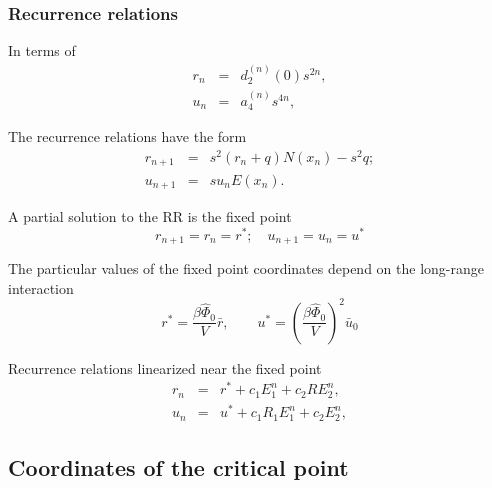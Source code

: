 \documentclass[8pt]{beamer}
\begin{document}
	\begin{frame}
		\frametitle{Recurrence relations}
		
		In terms of
		\begin{eqnarray*}
			r_n & = & d_2^{(n)}(0)s^{2n},
			\\
			u_n & = & a_4^{(n)}s^{4n},
		\end{eqnarray*}
		
		The recurrence relations have the form
		\begin{eqnarray*}
			r_{n+1} & = & s^2(r_n + q) N(x_n) - s^2 q;
			\nonumber\\
			u_{n+1} & = & s u_n E(x_n).
		\end{eqnarray*}
		
		A partial solution to the RR is the fixed point
		\begin{equation*}
			r_{n+1} = r_n = r^*; \quad u_{n+1} = u_n = u^*
		\end{equation*}
		
		The particular values of the fixed point coordinates depend on the long-range interaction
		\begin{equation*}
			r^* = \frac{\beta\hat{\Phi}_0}{V} \bar{r}, 
			\qquad 
			u^* = \left(\frac{\beta\hat{\Phi}_0}{V}\right)^2 \bar{u}_0
		\end{equation*}
		
		Recurrence relations linearized near the fixed point
		\begin{eqnarray*}
			r_n & = & r^* + c_1 E_1^n + c_2 R E_2^n,
			\nonumber \\
			u_n & = & u^* + c_1 R_1 E_1^n + c_2 E_2^n,
		\end{eqnarray*}
	\end{frame}
	
	\subsection{Coordinates of the critical point}
	
\end{document}
